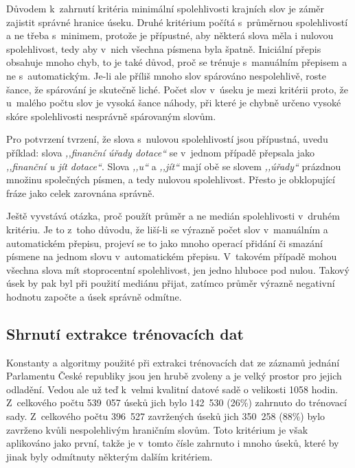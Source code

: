 Důvodem k~zahrnutí kritéria minimální spolehlivosti krajních slov je záměr
zajistit správné hranice úseku. Druhé kritérium počítá s~průměrnou spolehlivostí
a ne třeba s~minimem, protože je přípustné, aby některá slova měla i nulovou
spolehlivost, tedy aby v~nich všechna písmena byla špatně. Iniciální přepis
obsahuje mnoho chyb, to je také důvod, proč se trénuje s~manuálním přepisem a ne
s~automatickým. Je-li ale příliš mnoho slov spárováno nespolehlivě, roste šance,
že spárování je skutečně liché. Počet slov v~úseku je mezi kritérii proto, že
u~malého počtu slov je vysoká šance náhody, při které je chybně určeno vysoké
skóre spolehlivosti nesprávně spárovaným slovům.

Pro potvrzení tvrzení, že slova s~nulovou spolehlivostí jsou přípustná, uvedu
příklad: slova \textit{,,finanční úřady dotace``} se v~jednom případě přepsala jako
\textit{,,finanční u jít dotace``}. Slova \textit{,,u``} a \textit{,,jít``} mají
obě se slovem \textit{,,úřady``} prázdnou množinu společných písmen, a tedy
nulovou spolehlivost. Přesto je obklopující fráze jako celek zarovnána správně.

Ještě vyvstává otázka, proč použít průměr a ne medián spolehlivosti v~druhém
kritériu. Je to z~toho důvodu, že liší-li se výrazně počet slov v~manuálním a
automatickém přepisu, projeví se to jako mnoho operací přidání či smazání
písmene na jednom slovu v~automatickém přepisu. V~takovém případě
mohou všechna slova mít stoprocentní spolehlivost, jen jedno hluboce pod nulou.
Takový úsek by pak byl při použití mediánu přijat, zatímco průměr výrazně negativní
hodnotu započte a úsek správně odmítne.


\subsection{Shrnutí extrakce trénovacích dat}

Konstanty a algoritmy použité při extrakci trénovacích dat ze záznamů jednání
Parlamentu České republiky jsou jen hrubě zvoleny a je velký prostor pro jejich
odladění. Vedou ale už teď k~velmi kvalitní datové sadě o velikosti 1058 hodin.
Z~celkového počtu 539~057 úseků jich bylo 142~530 (26\%) zahrnuto do trénovací
sady. Z~celkového počtu 396~527 zavržených úseků jich 350~258 (88\%) bylo
zavrženo kvůli nespolehlivým hraničním slovům. Toto kritérium je však aplikováno
jako první, takže je v~tomto čísle zahrnuto i mnoho úseků, které by jinak byly
odmítnuty některým dalším kritériem.


